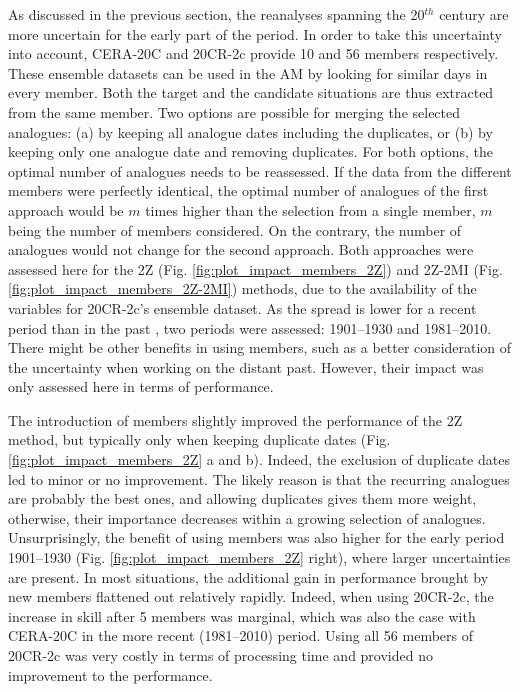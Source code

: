 \documentclass{ametsoc}
\begin{document}
	As discussed in the previous section, the reanalyses spanning the 20$^{th}$ century are more uncertain for the early part of the period. In order to take this uncertainty into account, CERA-20C and 20CR-2c provide 10 and 56 members respectively. These ensemble datasets can be used in the AM by looking for similar days in every member. Both the target and the candidate situations are thus extracted from the same member. Two options are possible for merging the selected analogues: (a) by keeping all analogue dates including the duplicates, or (b) by keeping only one analogue date and removing duplicates. For both options, the optimal number of analogues needs to be reassessed. If the data from the different members were perfectly identical, the optimal number of analogues of the first approach would be $m$ times higher than the selection from a single member, $m$ being the number of members considered. On the contrary, the number of analogues would not change for the second approach. Both approaches were assessed here for the 2Z (Fig. \ref{fig:plot_impact_members_2Z}) and 2Z-2MI (Fig. \ref{fig:plot_impact_members_2Z-2MI}) methods, due to the availability of the variables for 20CR-2c's ensemble dataset. As the spread is lower for a recent period than in the past \citep{Compo2011}, two periods were assessed: 1901--1930 and 1981--2010. There might be other benefits in using members, such as a better consideration of the uncertainty when working on the distant past. However, their impact was only assessed here in terms of performance.
	
	The introduction of members slightly improved the performance of the 2Z method, but typically only when keeping duplicate dates (Fig. \ref{fig:plot_impact_members_2Z} a and b). Indeed, the exclusion of duplicate dates led to minor or no improvement. The likely reason is that the recurring analogues are probably the best ones, and allowing duplicates gives them more weight, otherwise, their importance decreases within a growing selection of analogues. Unsurprisingly, the benefit of using members was also higher for the early period 1901--1930 (Fig. \ref{fig:plot_impact_members_2Z} right), where larger uncertainties are present. In most situations, the additional gain in performance brought by new members flattened out relatively rapidly. Indeed, when using 20CR-2c, the increase in skill after 5 members was marginal, which was also the case with CERA-20C in the more recent (1981--2010) period. Using all 56 members of 20CR-2c was very costly in terms of processing time and provided no improvement to the performance. 
	
\end{document}
